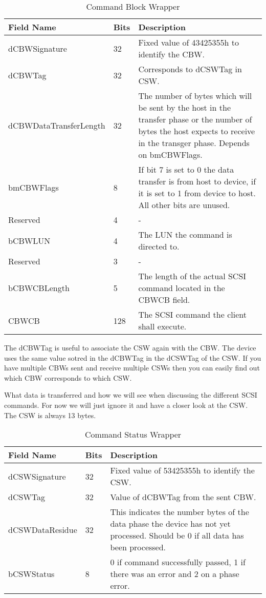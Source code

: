 \begin{table}[ht]
\caption{Command Block Wrapper \cite{usb_ms_jan}}
\centering
\begin{tabular}{|l|l|p{9cm}|}
\hline\hline
\textbf{Field Name} & \textbf{Bits} & \textbf{Description}\\ \hline
dCBWSignature & 32 & Fixed value of 43425355h to identify the CBW. \\ \hline
dCBWTag & 32 & Corresponds to dCSWTag in CSW. \\ \hline
dCBWDataTransferLength & 32 & The number of bytes which will be sent by the host in the transfer phase or the number of bytes the host expects to receive in the transger phase. Depends on bmCBWFlags. \\ \hline
bmCBWFlags & 8 & If bit 7 is set to 0 the data transfer is from host to device, if it is set to 1 from device to host. All other bits are unused. \\ \hline
Reserved & 4 & - \\ \hline
bCBWLUN & 4 & The LUN the command is directed to. \\ \hline
Reserved & 3 & - \\ \hline
bCBWCBLength & 5 & The length of the actual SCSI command located in the CBWCB field. \\ \hline
CBWCB & 128 & The SCSI command the client shall execute. \\ \hline
\end{tabular}
\label{table:cbw}
\end{table}

The dCBWTag is useful to associate the CSW again with the CBW. The device uses the same value sotred in the dCBWTag in the dCSWTag of the CSW. If you have multiple CBWs sent and receive multiple CSWs then you can easily find out which CBW corresponds to which CSW.

What data is transferred and how we will see when discussing the different SCSI commands. For now we will just ignore it and have a closer look at the CSW. The CSW is always 13 bytes.

\begin{table}[ht]
\caption{Command Status Wrapper \cite{usb_ms_jan}}
\centering
\begin{tabular}{|l|l|p{9cm}|}
\hline\hline
\textbf{Field Name} & \textbf{Bits} & \textbf{Description}\\ \hline
dCSWSignature & 32 & Fixed value of 53425355h to identify the CSW. \\ \hline
dCSWTag & 32 & Value of dCBWTag from the sent CBW. \\ \hline
dCSWDataResidue & 32 & This indicates the number bytes of the data phase the device has not yet processed. Should be 0 if all data has been processed. \\ \hline
bCSWStatus & 8 & 0 if command successfully passed, 1 if there was an error and 2 on a phase error. \\ \hline
\end{tabular}
\label{table:csw}
\end{table}

